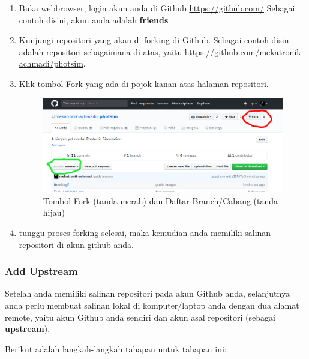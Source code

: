 \documentclass[12pt]{article}
\begin{document}
	\begin{enumerate}
		\item Buka webbrowser, login akun anda di Github \url{https://github.com/}
		Sebagai contoh disini, akun anda adalah \textbf{friends}
		\item Kunjungi repositori yang akan di forking di Github.
		Sebagai contoh disini adalah repositori sebagaimana di atas, yaitu \url{https://github.com/mekatronik-achmadi/photsim}.
		\item Klik tombol Fork yang ada di pojok kanan atas halaman repositori.
		 
		\begin{figure}[h!]
			\centering
			\captionsetup{justification=centering}
			\includegraphics[width=0.8\linewidth]{../images/png/fork_branch}
			\caption[Tombol Fork dan Branch]{\small{Tombol Fork (tanda merah) dan Daftar Branch/Cabang (tanda hijau)}}
		\end{figure}
	
		\item tunggu proses forking selesai, maka kemudian anda memiliki salinan repositori di akun github anda.
	 
	\end{enumerate}
	
	\subsubsection{Add Upstream}
	
	Setelah anda memiliki salinan repositori pada akun Github anda,
	selanjutnya anda perlu membuat salinan lokal di komputer/laptop anda dengan dua alamat remote,
	yaitu akun Github anda sendiri dan akun asal repositori (sebagai \textbf{upstream}).
	
	Berikut adalah langkah-langkah tahapan untuk tahapan ini:
	
\end{document}
